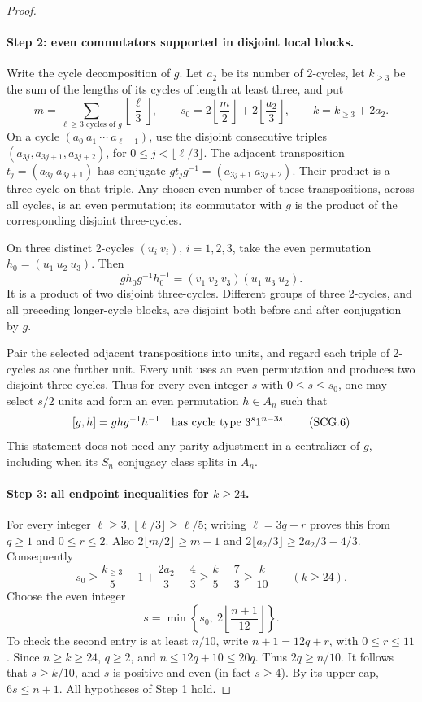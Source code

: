 \begin{proof}
\paragraph{Step 2: even commutators supported in disjoint local blocks.}
Write the cycle decomposition of $g$. Let $a_2$ be its number of
2-cycles, let $k_{\ge3}$ be the sum of the lengths of its cycles
of length at least three, and put
\[
 m=\sum_{\ell\ge3\text{ cycles of }g}\left\lfloor\frac\ell3\right\rfloor,
 \qquad
 s_0=2\left\lfloor\frac m2\right\rfloor
               +2\left\lfloor\frac{a_2}3\right\rfloor,
 \qquad k=k_{\ge3}+2a_2.
 \tag{SCG.4}
\]
On a cycle $(a_0\ a_1\ \cdots\ a_{\ell-1})$, use the disjoint
consecutive triples
$(a_{3j},a_{3j+1},a_{3j+2})$, for
$0\le j<\lfloor\ell/3\rfloor$.
The adjacent transposition $t_j=(a_{3j}\ a_{3j+1})$ has conjugate
$g t_jg^{-1}=(a_{3j+1}\ a_{3j+2})$.
Their product is a three-cycle on that triple. Any chosen even
number of these transpositions, across all cycles, is an even
permutation; its commutator with $g$ is the product of the
corresponding disjoint three-cycles.

On three distinct 2-cycles $(u_i\ v_i)$, $i=1,2,3$, take the even
permutation $h_0=(u_1\ u_2\ u_3)$. Then
\[
        g h_0g^{-1}h_0^{-1}
          =(v_1\ v_2\ v_3)(u_1\ u_3\ u_2).
          \tag{SCG.5}
\]
It is a product of two disjoint three-cycles. Different groups of
three 2-cycles, and all preceding longer-cycle blocks, are disjoint
both before and after conjugation by $g$.

Pair the selected adjacent transpositions into units, and regard
each triple of 2-cycles as one further unit. Every unit uses an
even permutation and produces two disjoint three-cycles. Thus for
every even integer $s$ with $0\le s\le s_0$, one may select $s/2$
units and form an even permutation $h\in A_n$ such that
\[
                 [g,h]=g h g^{-1}h^{-1}
                   \quad\hbox{has cycle type }3^s1^{n-3s}.
                 \tag{SCG.6}
\]
This statement does not need any parity adjustment in a centralizer
of $g$, including when its $S_n$ conjugacy class splits in $A_n$.

\paragraph{Step 3: all endpoint inequalities for $k\ge24$.}
For every integer $\ell\ge3$,
$\lfloor\ell/3\rfloor\ge\ell/5$; writing $\ell=3q+r$ proves this
from $q\ge1$ and $0\le r\le2$. Also
$2\lfloor m/2\rfloor\ge m-1$ and
$2\lfloor a_2/3\rfloor\ge2a_2/3-4/3$.
Consequently
\[
 s_0\ge\frac{k_{\ge3}}5-1+\frac{2a_2}3-\frac43
       \ge\frac k5-\frac73\ge\frac{k}{10}
                       \qquad(k\ge24).
 \tag{SCG.7}
\]
Choose the even integer
\[
             s=\min\left\{s_0,\ 2\left\lfloor\frac{n+1}{12}\right\rfloor\right\}.
             \tag{SCG.8}
\]
To check the second entry is at least $n/10$, write
$n+1=12q+r$, with $0\le r\le11$.
Since $n\ge k\ge24$, $q\ge2$, and
$n\le12q+10\le20q$. Thus $2q\ge n/10$.
It follows that $s\ge k/10$, and $s$ is positive and even
(in fact $s\ge4$). By its upper cap, $6s\le n+1$.
All hypotheses of Step 1 hold.


\end{proof}
